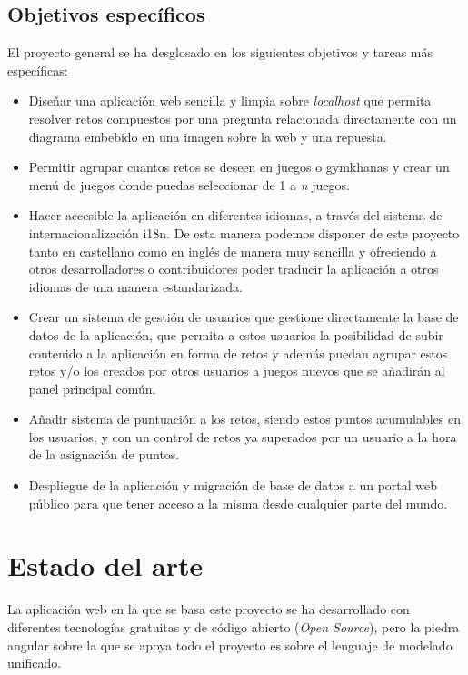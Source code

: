 \documentclass[a4paper, 12pt]{book}
\begin{document}
\section{Objetivos específicos}
\label{sec:objetivos-especificos}
El proyecto general se ha desglosado en los siguientes objetivos y tareas más específicas: 
\begin{itemize}
	\item Diseñar una aplicación web sencilla y limpia sobre \emph{localhost} que permita resolver retos compuestos por una pregunta relacionada directamente con un diagrama embebido en una imagen sobre la web y una repuesta.
	\item Permitir agrupar cuantos retos se deseen en juegos o gymkhanas y crear un menú de juegos donde puedas seleccionar de 1 a \emph{n} juegos.
	\item Hacer accesible la aplicación en diferentes idiomas, a través del sistema de internacionalización i18n. De esta manera podemos disponer de este proyecto tanto en castellano como en inglés de manera muy sencilla y ofreciendo a otros desarrolladores o contribuidores poder traducir la aplicación a otros idiomas de una manera estandarizada. 
	\item Crear un sistema de gestión de usuarios que gestione directamente la base de datos de la aplicación, que permita a estos usuarios la posibilidad de subir contenido a la aplicación en forma de retos y además puedan agrupar estos retos y/o los creados por otros usuarios a juegos nuevos que se añadirán al panel principal común.
	\item Añadir sistema de puntuación a los retos, siendo estos puntos acumulables en los usuarios, y con un control de retos ya superados por un usuario a la hora de la asignación de puntos. 
	\item Despliegue de la aplicación y migración de base de datos a un portal web público para que tener acceso a la misma desde cualquier parte del mundo.
\end{itemize}



\cleardoublepage
\chapter{Estado del arte}
\label{chap:estado}
La aplicación web en la que se basa este proyecto se ha desarrollado con diferentes tecnologías gratuitas y de código abierto (\emph{Open Source}), pero la piedra angular sobre la que se apoya todo el proyecto es sobre el lenguaje de modelado unificado. 
\end{document}

